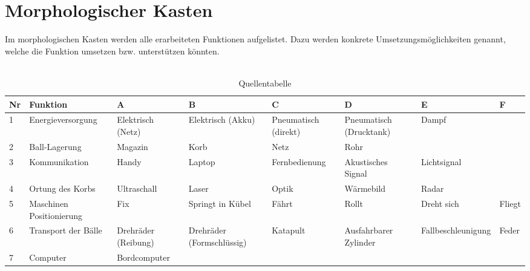 
\section{Morphologischer Kasten}
Im morphologischen Kasten werden alle erarbeiteten Funktionen aufgelistet. Dazu werden konkrete Umsetzungsmöglichkeiten genannt, welche die Funktion umsetzen bzw. unterstützen könnten.\\
\\

\begin{table}[h!]
	\centering
	\begin{tabular}{l l l l l l l l}
		Nr & Funktion & A & B & C & D & E & F \\
		\hline
		
		1 & Energieversorgung & Elektrisch (Netz) & Elektrisch (Akku) & Pneumatisch (direkt) & Pneumatisch (Drucktank) & Dampf & \\
		
		2 & Ball-Lagerung & Magazin & Korb & Netz & Rohr & & \\
		
		3 & Kommunikation & Handy & Laptop & Fernbedienung & Akustisches Signal & Lichtsignal & \\
		
		4 & Ortung des Korbs & Ultraschall & Laser & Optik & Wärmebild & Radar & \\
		
		5 & Maschinen Positionierung & Fix & Springt in Kübel & Fährt & Rollt & Dreht sich & Fliegt \\
		
		6 & Transport der Bälle & Drehräder (Reibung) & Drehräder (Formschlüssig) & Katapult & Ausfahrbarer Zylinder & Fallbeschleunigung & Feder \\
		
		7 & Computer & Bordcomputer & & & & & \\
		
	\end{tabular}
	\caption{Quellentabelle}
	\label{tab:quelle}
\end{table}
